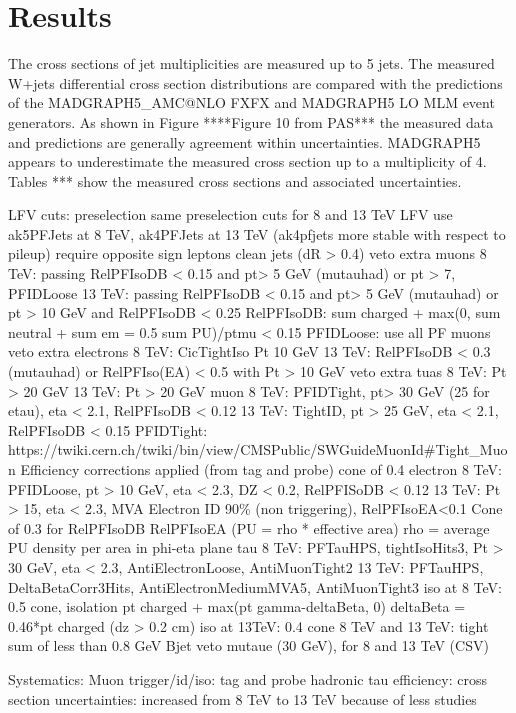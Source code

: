 \documentclass[oneside, letterpaper, oldfontcommands]{memoir}
\begin{document}
{{{\section{Results}
\qquad The cross sections of jet multiplicities are measured up to 5 jets. The measured W+jets differential cross section distributions are compared with the predictions of the MADGRAPH5_AMC@NLO FXFX and MADGRAPH5 LO MLM event generators. As shown in Figure ****Figure 10 from PAS*** the measured data and predictions are generally agreement within uncertainties. MADGRAPH5 appears to underestimate the measured cross section up to a multiplicity of 4. Tables *** show the measured cross sections and associated uncertainties.





LFV cuts:
preselection
same preselection cuts for 8 and 13 TeV LFV
use ak5PFJets at 8 TeV, ak4PFJets at 13 TeV (ak4pfjets more stable with respect to pileup)
require opposite sign leptons
clean jets (dR > 0.4)
veto extra muons
	8 TeV:  passing RelPFIsoDB < 0.15 and pt> 5 GeV (mutauhad) or pt > 7, PFIDLoose
	13 TeV: passing RelPFIsoDB < 0.15 and pt> 5 GeV (mutauhad) or pt > 10 GeV and RelPFIsoDB < 0.25
	RelPFIsoDB: sum charged + max(0, sum neutral + sum em = 0.5 sum PU)/ptmu < 0.15
	PFIDLoose: use all PF muons
veto extra electrons
	8 TeV: CicTightIso Pt  10 GeV
	13 TeV: RelPFIsoDB < 0.3 (mutauhad) or RelPFIso(EA) < 0.5 with Pt > 10 GeV
veto extra tuas
	8 TeV: Pt > 20 GeV
	13 TeV: Pt > 20 GeV
muon
	8 TeV: PFIDTight, pt> 30 GeV (25 for etau), eta < 2.1, RelPFIsoDB < 0.12
	13 TeV: TightID, pt > 25 GeV, eta < 2.1, RelPFIsoDB < 0.15
	PFIDTight: https://twiki.cern.ch/twiki/bin/view/CMSPublic/SWGuideMuonId#Tight_Muon
	Efficiency corrections applied (from tag and probe)
	cone of 0.4
electron
	8 TeV: PFIDLoose, pt > 10 GeV, eta < 2.3, DZ < 0.2, RelPFISoDB < 0.12
	13 TeV: Pt > 15, eta < 2.3, MVA Electron ID 90\% (non triggering), RelPFIsoEA<0.1
	Cone of 0.3 for RelPFIsoDB
	RelPFIsoEA (PU = rho * effective area)
	rho = average PU density per area in phi-eta plane
tau
	8 TeV: PFTauHPS, tightIsoHits3, Pt > 30 GeV, eta < 2.3, AntiElectronLoose, AntiMuonTight2
	13 TeV: PFTauHPS, DeltaBetaCorr3Hits, AntiElectronMediumMVA5, AntiMuonTight3
	iso at 8 TeV: 0.5 cone, isolation pt charged + max(pt gamma-deltaBeta, 0)
	deltaBeta = 0.46*pt charged (dz > 0.2 cm)
	iso at 13TeV: 0.4 cone
	8 TeV and 13 TeV: tight sum of less than 0.8 GeV
Bjet veto mutaue (30 GeV), for 8 and 13 TeV (CSV)

Systematics:
Muon trigger/id/iso: tag and probe
hadronic tau efficiency: 
cross section uncertainties: increased from 8 TeV to 13 TeV because of less studies

}}}
\end{document}

